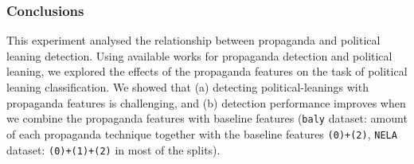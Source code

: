 


\subsubsection{Conclusions}

This experiment analysed the relationship between propaganda and political leaning detection. Using available works for propaganda detection and political leaning, we explored the effects of the propaganda features on the task of political leaning classification. We showed that %
(a) detecting political-leanings with propaganda features is challenging, and (b) detection performance improves when we combine the propaganda features with baseline features (\texttt{baly} dataset: amount of each propaganda technique together with the baseline features \texttt{(0)+(2)}, \texttt{NELA} dataset: \texttt{(0)+(1)+(2)} in most of the splits).


